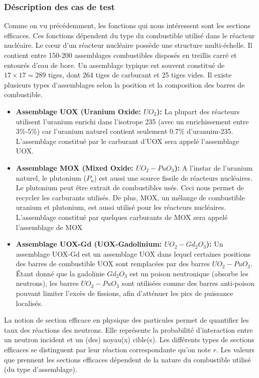 \subsubsection{Déscription des cas de test}
\hspace{0.5cm}
Comme on vu précédemment, les fonctions qui nous intéressent sont les sections efficaces. Ces fonctions dépendent du type du combustible utilisé dans le réacteur nucléaire. Le cœur d'un réacteur nucléaire possède une structure multi-échelle. Il contient entre 150-200 assemblages combustibles disposés en treillis carré et entourés d'eau de bore. Un assemblage typique est souvent constitué de $17 \times 17=289$ tiges, dont 264 tiges de carburant et 25 tiges vides. Il existe plusieurs types d'assemblages selon la position et la composition des barres de combustible.
\begin{itemize}
\item \textbf{Assemblage UOX (Uranium Oxide: $UO_2$):}
La plupart des réacteurs utilisent l'uranium enrichi dans l'isotrope 235 (avec un enrichissement entre 3\%-5\%) car l'uranium naturel contient seulement 0.7\% d'uranuim-235. L'assemblage constitué par le carburant d'UOX sera appelé l'assemblage UOX.
\item \textbf{Assemblage MOX (Mixed Oxide: $UO_2-PuO_3$):}
A l'instar de l'uranium naturel, le plutonium ($P_u$) est aussi une source fissile de réacteurs nucléaires. Le plutonium peut être extrait de combustibles usés. Ceci nous permet de recycler les carburants utilisés. De plus, MOX, un mélange de combustible uranium et plutonium, est aussi utilisé pour les réacteurs nucléaires. L'assemblage constitué par quelques carburants de MOX sera appelé l'assemblage de MOX
\item \textbf{Assemblage UOX-Gd (UOX-Gadolinium: $UO_2-Gd_2O_3$):}
Un assemblage UOX-Gd est un assemblage UOX dans lequel certaines positions des barres de combustible UOX sont remplacées par des barres $UO_2-PuO_3$. Étant donné que la gadolinie $Gd_2O_3$ est un poison neutronique (absorbe les neutrons), les barres $UO_2-PuO_3$ sont utilisées comme des barres anti-poison pouvant limiter l'excès de fissions, afin d'atténuer les pics de puissance localisés.
\end{itemize}
\vspace{0.5cm}
\hspace{0.5cm}
La notion de section efficace en physique des particules permet de quantifier les taux des réactions des neutrons. Elle représente la probabilité d'interaction entre un neutron incident et un (des) noyau(x) cible(s). Les différents types de sections efficaces se distinguent par leur réaction correspondante qu'on note $r$. Les valeurs que prennent les sections efficaces dépendent de la nature du combustible utilisé (du type d'assemblage).\\
